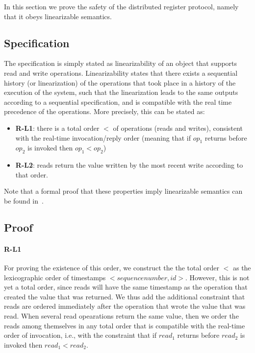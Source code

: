 In this section we prove the safety of the distributed register
protocol, namely that it obeys linearizable semantics.


\subsection{Specification}

The specification is simply stated as linearizability of an
object that supports read and write operations.
Linearizability states that there exists a sequential history (or
linearization) of the operations that took place in a history
of the execution of the system, such that the linearization leads
to the same outputs according to a sequential specification, and is
compatible with the real time precedence of the operations. More
precisely, this can be stated as:

\begin{itemize}
    \item[] \textbf{R-L1}: there is a total order $<$ of
        operations (reads and writes), consistent with the
        real-time invocation/reply order (meaning that if $op_1$
        returns before $op_2$ is invoked then $op_1 < op_2$)
    \item[] \textbf{R-L2}: reads return the value written by the
        most recent write according to that order.
\end{itemize}

Note that a formal proof that these properties imply linearizable semantics
can be found in~\cite{nancy-book}.

\subsection{Proof}

\paragraph{R-L1}
For proving the existence of this order, we construct the
the total order $<$ as the
lexicographic order of timestamps $<sequence number, id>$.
However, this is not yet a total order, since reads will have the same
timestamp as the operation that created the value that was returned. We
thus add the additional constraint that reads are ordered immediately
after the operation that wrote the value that was read. When several
read opearations return the same value, then we order the
reads among themselves in any total order that is compatible with the
real-time order of invocation, i.e., with the constraint that
if $read_1$ returns before $read_2$ is invoked then $read_1 < read_2$.

